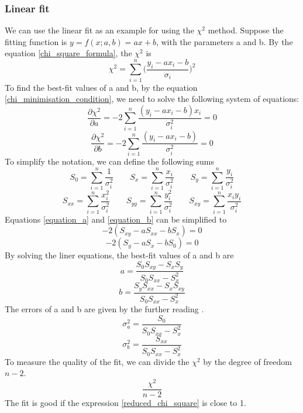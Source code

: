 \documentclass[12pt,a4paper]{report}
\begin{document}
\subsubsection{Linear fit}
We can use the linear fit as an example for using the $\chi^2$ method.
Suppose the fitting function is $y = f(x;a,b) = ax + b$, with the parameters a and b.
By the equation \ref{chi_square_formula}, the $\chi^2$ is
\begin{equation}
\chi^2 = \sum_{i = 1}^{n} \Big ( \frac{y_i - a x_i - b}{\sigma_i} \Big )^2
\end{equation}
To find the best-fit values of a and b, by the equation \ref{chi_minimisation_condition}, we need to solve the following system of equations:
\begin{equation} \label{equation_a}
\frac{\partial \chi^2}{\partial a} = -2 \sum_{i = 1}^{n} \frac{ (y_i - a x_i - b) x_i }{\sigma_i^2} = 0
\end{equation}
\begin{equation} \label{equation_b}
\frac{\partial \chi^2}{\partial b} = -2 \sum_{i = 1}^{n} \frac{ (y_i - a x_i - b) }{\sigma_i^2} = 0
\end{equation}
To simplify the notation, we can define the following sums
\begin{equation*}
S_0 = \sum_{i = 1}^{n} \frac{1}{\sigma_i^2} \qquad
S_x = \sum_{i = 1}^{n} \frac{x_i}{\sigma_i^2} \qquad
S_y = \sum_{i = 1}^{n} \frac{y_i}{\sigma_i^2}
\end{equation*}
\begin{equation*}
S_{xx} = \sum_{i = 1}^{n} \frac{x_i^2}{\sigma_i^2} \qquad
S_{yy} = \sum_{i = 1}^{n} \frac{y_i^2}{\sigma_i^2} \qquad
S_{xy} = \sum_{i = 1}^{n} \frac{x_i y_i}{\sigma_i^2}
\end{equation*}
Equations \ref{equation_a} and \ref{equation_b} can be simplified to
\begin{equation}
-2(S_{xy} - a S_{xx} - b S_x) = 0
\end{equation}
\begin{equation}
-2(S_y - a S_x - b S_0) = 0
\end{equation}
By solving the liner equations, the best-fit values of a and b are
\begin{equation}
a = \frac{S_0 S_{xy} - S_x S_y}{S_0 S_{xx} - S_x^2}
\end{equation}
\begin{equation}
b = \frac{S_y S_{xx} - S_x S_{xy}}{S_0 S_{xx} - S_x^2}
\end{equation}
The errors of a and b are given by the further reading \cite{stat_2}.
\begin{equation}
\sigma_a^2 = \frac{S_0}{S_0 S_{xx} - S_x^2}
\end{equation}
\begin{equation}
\sigma_b^2 = \frac{S_{xx}}{S_0 S_{xx} - S_x^2}
\end{equation}
To measure the quality of the fit, we can divide the $\chi^2$ by the degree of freedom $n-2$.
\begin{equation} \label{reduced_chi_square}
\frac{\chi^2}{n-2}
\end{equation}
The fit is good if the expression \ref{reduced_chi_square} is close to 1.
\end{document}
